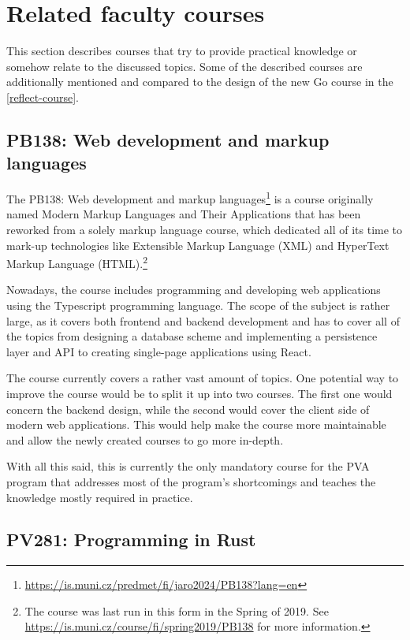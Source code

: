 \documentclass[
  digital,
  color,
  oneside,
  nosansbold,
  nocolorbold,
  nolof,
  nolot,
]{fithesis4}
\begin{document}
\section{Related faculty courses}

This section describes courses that try to provide practical knowledge or somehow relate to the discussed topics. Some of the described courses are additionally mentioned and compared to the design of the new Go course in the \cref{reflect-course}.

\subsection{PB138: Web development and markup languages}\label{web-dev}

The PB138: Web development and markup languages\footnote{\url{https://is.muni.cz/predmet/fi/jaro2024/PB138?lang=en}}
is a course originally named Modern Markup Languages and Their Applications that has been reworked from a solely markup language course, which dedicated all of its time to mark-up technologies like Extensible Markup Language (XML) and HyperText Markup Language (HTML).\footnote{The course was last run in this form in the Spring of 2019. See \url{https://is.muni.cz/course/fi/spring2019/PB138} for more information.}

Nowadays, the course includes programming and developing web applications using the Typescript programming language\cite{typescript}. The scope of the subject is rather large, as it covers both frontend and backend development and has to cover all of the topics from designing a database scheme and implementing a persistence layer and API to creating single-page applications using React\cite{react}.

The course currently covers a rather vast amount of topics. One potential way to improve the course would be to split it up into two courses. The first one would concern the backend design, while the second would cover the client side of modern web applications. This would help make the course more maintainable and allow the newly created courses to go more in-depth.

With all this said, this is currently the only mandatory course for the PVA program that addresses most of the program's shortcomings and teaches the knowledge mostly required in practice.

\subsection{PV281: Programming in Rust}\label{rust-course}
\end{document}
